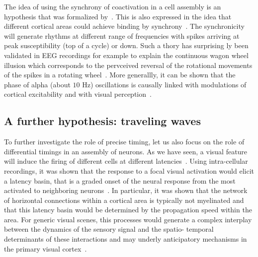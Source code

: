 \documentclass[brainsci, %
               review,submit,pdftex,moreauthors%
               ]{Definitions/mdpi}
\begin{document}
The idea of using the synchrony of coactivation in a cell assembly is an hypothesis that was formalized by~\citet{hebb_organization_1949}. 
This is also expressed in the idea that different cortical areas could achieve binding by synchrony~\citep{fries_mechanism_2005}. The synchronicity will generate rhythms at different range of frequencies with spikes arriving at peak susceptibility (top of a cycle) or down. Such a thory has surprising ly been validated in EEG recordings for example to explain the continuous wagon wheel illusion which corresponds to the pervceived reversal of the rotational movements of the spikes in a rotating wheel~\citep{vanrullen_continuous_2006}. More generallly, it can be shown that the phase of alpha (about $10$ Hz) oscillations  is causally linked with modulations of cortical excitability and with visual perception~\citep{dugue_phase_2011}. 
%
\subsection{A further hypothesis: traveling waves}
To further investigate the role of precise timing, let us also focus on the role of differential timings in an assembly of neurons. As we have seen, a visual feature will induce the firing of different cells at different latencies~\citep{celebrini_dynamics_1993}. Using intra-cellular recordings, it was shown that the response to a focal visual activation would elicit a latency basin, that is a graded onset of the neural response from the most activated to neighboring neurons~\citep{bringuier_horizontal_1999}. In particular, it was shown that the network of horizontal connections within a cortical area is typically not myelinated and that this latency basin would be determined by the propagation speed within the area. For generic visual scenes, this processes would generate a complex interplay between the dynamics of the sensory signal and the spatio- temporal determinants of these interactions and may underly anticipatory mechanisms in the primary visual cortex~\citep{benvenuti_anticipatory_2020,le_bec_horizontal_2022}.
%
\end{document}
